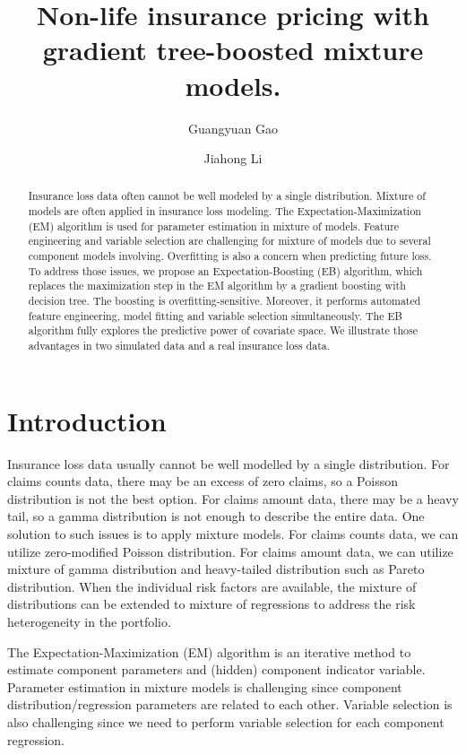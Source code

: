 \documentclass[11pt]{article}
\title{Non-life insurance pricing with gradient tree-boosted mixture models.}
\author{Guangyuan Gao \and Jiahong Li}
\numberwithin{equation}{section}
\begin{document}
\maketitle

\begin{abstract}
Insurance loss data often cannot be well modeled by a single distribution. Mixture of models are often applied in insurance loss modeling. 
The Expectation-Maximization (EM) algorithm is used for parameter estimation in mixture of models. 
Feature engineering and variable selection are challenging for mixture of models due to several component models involving. 
Overfitting is also a concern when predicting future loss. 
To address those issues, we propose an Expectation-Boosting (EB) algorithm, 
which replaces the maximization step in the EM algorithm by a gradient boosting with decision tree. The boosting is overfitting-sensitive. 
Moreover, it performs automated feature engineering, model fitting and variable selection simultaneously. 
The EB algorithm fully explores the predictive power of covariate space.
We illustrate those advantages in two simulated data and a real insurance loss data.

\end{abstract}

\section{Introduction}

Insurance loss data usually cannot be well modelled by a single distribution.
For claims counts data, there may be an excess of zero claims, so a Poisson distribution is not the best option.
For claims amount data, there may be a heavy tail, so a gamma distribution is not enough to describe the entire data.
One solution to such issues is to apply mixture models.
For claims counts data, we can utilize zero-modified Poisson distribution.
For claims amount data, we can utilize mixture of gamma distribution and heavy-tailed distribution such as Pareto distribution.
When the individual risk factors are available, the mixture of distributions can be extended to mixture of regressions to address the risk heterogeneity in the portfolio.

The Expectation-Maximization (EM) algorithm is an iterative method to estimate component parameters and (hidden) component indicator variable. 
Parameter estimation in mixture models is challenging since component distribution/regression parameters are related to each other. 
Variable selection  is also challenging since we need
to perform variable selection for each component regression.  
\end{document}
